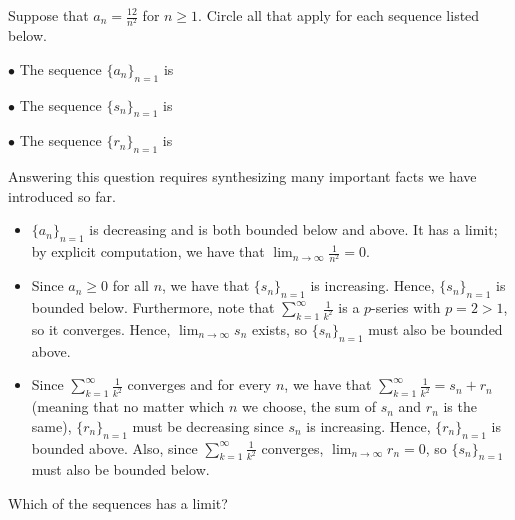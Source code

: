 \documentclass{ximera}
\author{Jim Talamo}
\begin{document}
\begin{exercise}

Suppose that $a_n = \frac{12}{n^2}$ for $n \geq 1$. Circle all that apply for each sequence listed below.

$\bullet$ The sequence $\{a_n\}_{n=1}$ is
\begin{selectAll}
\end{selectAll}

$\bullet$ The sequence $\{s_n\}_{n=1}$ is
\begin{selectAll}
\end{selectAll}

$\bullet$ The sequence $\{r_n\}_{n=1}$ is
\begin{selectAll}
\end{selectAll}

\begin{hint}
Answering this question requires synthesizing many important facts we have introduced so far.

\begin{itemize}
\item $\{a_n\}_{n=1}$ is decreasing and is both bounded below and above.  It has a limit; by explicit computation, we have that $\lim_{n \to \infty} \frac{1}{n^2}=0$.
\item Since $a_n \geq 0$ for all $n$, we have that $\{s_n\}_{n=1}$ is increasing.  Hence, $\{s_n\}_{n=1}$ is bounded below.  Furthermore, note that $\sum_{k=1}^{\infty} \frac{1}{k^2}$ is a $p$-series with $p =2>1$, so it converges.  Hence, $\lim_{n \to \infty} s_n$ exists, so $\{s_n\}_{n=1}$ must also be bounded above.
\item Since $\sum_{k=1}^{\infty} \frac{1}{k^2}$ converges and for every $n$, we have that $\sum_{k=1}^{\infty} \frac{1}{k^2} = s_n +r_n$ (meaning that no matter which $n$ we choose, the sum of $s_n$ and $r_n$ is the same), $\{r_n\}_{n=1}$ must be decreasing since $s_n$ is increasing.  Hence, $\{r_n\}_{n=1}$ is bounded above.  Also, since $\sum_{k=1}^{\infty} \frac{1}{k^2}$ converges, $\lim_{n \to \infty} r_n=0$, so $\{s_n\}_{n=1}$ must also be bounded below.
\end{itemize}

\end{hint}

\begin{exercise}
Which of the sequences has a limit?
\begin{selectAll}
\end{selectAll}
\end{exercise}

\end{exercise}
\end{document}
